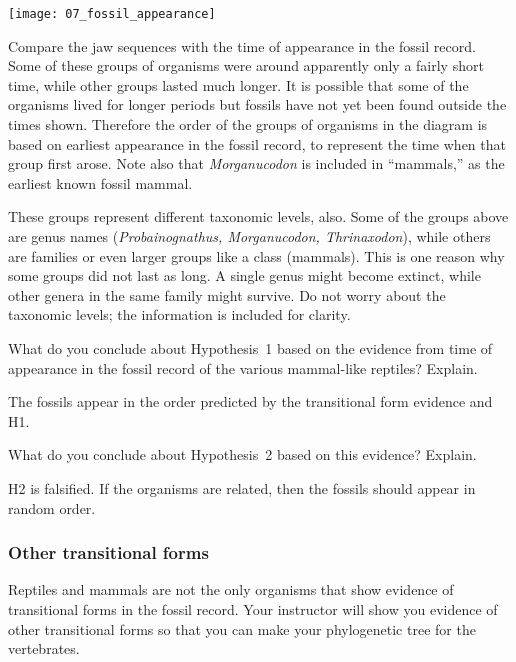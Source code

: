 \documentclass[12pt, hidelinks]{exam}
\newcommand*\AnswerBox[2]{%
    \parbox[t][#1]{0.92\textwidth}{%
    \begin{solution}#2\end{solution}}
    \vspace{\stretch{1}}
}
\begin{document}
\begin{questions}
\begin{center}
\texttt{[image: 07\_fossil\_appearance]}
\end{center}

Compare the jaw sequences with the time of appearance in the
fossil record. Some of these groups of organisms were around apparently
only a fairly short time, while other groups lasted much longer. It is possible
that some of the organisms lived for longer periods but fossils have not yet been
found outside the times shown. Therefore the order of the groups of organisms in the diagram is based on earliest
appearance in the fossil record, to represent the time when that
group first arose. Note also that \textit{Morganucodon} is included
in ``mammals,'' as the earliest known
fossil mammal.

These groups represent different taxonomic levels, also. Some of the
groups above are genus names (\emph{Probainognathus, Morganucodon,
Thrinaxodon}), while others are families or even larger groups like a class 
(mammals). This is one reason why some groups did not last as
long. A single genus might become extinct, while other genera in the
same family might survive. Do not worry about the taxonomic
levels; the information is included for clarity.

\question
What do you conclude about Hypothesis~1 based on the
evidence from time of appearance in the fossil record of the various
mammal-like reptiles? Explain. 

\AnswerBox{2\baselineskip}{%
The fossils appear in the order predicted by the transitional form evidence and H1.
}

\question
What do you conclude about Hypothesis~2 based on this
evidence? Explain.

\AnswerBox{2\baselineskip}{%
H2 is falsified. If the organisms are related, then the fossils should appear in random order.
}


\subsubsection*{Other transitional forms}

Reptiles and mammals are not the only organisms that show evidence of transitional forms in the fossil record. Your instructor will show you evidence of other transitional forms so that you can make your phylogenetic tree for the vertebrates. 


\end{questions}
\end{document}

